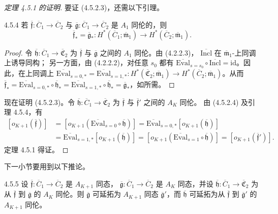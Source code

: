 \begin{proof}[定理 4.5.1 的证明]
要证 (4.5.2.3)，还需以下引理。
\begin{lemma}{4.5.4}\label{lem:4-5-4}
若 $\overline{\mathfrak f}\colon\overline C_1\to\overline C_2$
与 $\overline{\mathfrak g}\colon\overline C_1\to\overline C_2$
是 $A_1$ 同伦的，则
\[
 \overline{\mathfrak f}_*=\overline{\mathfrak g}_*\colon
 H^*(\overline C_1;\overline{\mathfrak m}_1)
 \longrightarrow
 H^*(\overline C_2;\overline{\mathfrak m}_1).
\]
\end{lemma}
\begin{proof}
令 $\overline{\mathfrak h}\colon\overline C_1\to
\overline{\mathfrak C}_2$ 为
$\overline{\mathfrak f}$ 与 $\overline{\mathfrak g}$
之间的 $A_1$ 同伦。由 (4.2.2.3)，
$\overline{\mathrm{Incl}}$ 在
$\overline{\mathfrak m}_1$-上同调上诱导同构；
另一方面，由 (4.2.2.2)，对任意 $s_0$ 都有
$\overline{\mathrm{Eval}}_{s=s_0}
\circ\overline{\mathrm{Incl}}=\mathrm{id}$。因此，在上同调上
$\overline{\mathrm{Eval}}_{s=0,*}
=\overline{\mathrm{Eval}}_{s=1,*}\colon
H^*(\overline{\mathfrak C}_2;\overline{\mathfrak m}_1)
\to H^*(\overline C_2;\overline{\mathfrak m}_1)$。从而
$\overline{\mathfrak f}_*
=\overline{\mathrm{Eval}}_{s=0,*}
\circ\overline{\mathfrak h}_*
=\overline{\mathrm{Eval}}_{s=1,*}
\circ\overline{\mathfrak h}_*
=\overline{\mathfrak g}_*$，如所需。
\end{proof}

现在证明 (4.5.2.3)。令
$\overline{\mathfrak h}\colon\overline C_1
\to\overline{\mathfrak C}_2$
为 $\overline{\mathfrak f}$ 与
$\overline{\mathfrak f}'$ 之间的 $A_K$ 同伦。
由 (4.5.2.4) 及引理 4.5.4，有
\[
 \begin{aligned}
 [o_{K+1}(\overline{\mathfrak f})]
 &=[o_{K+1}(\overline{\mathrm{Eval}}_{s=0}
       \circ\overline{\mathfrak h})]
  =\overline{\mathrm{Eval}}_{s=0,*}
       [o_{K+1}(\overline{\mathfrak h})]\\
 &=\overline{\mathrm{Eval}}_{s=1,*}
       [o_{K+1}(\overline{\mathfrak h})]
  =[o_{K+1}(\overline{\mathrm{Eval}}_{s=1}
       \circ\overline{\mathfrak h})]
  =[o_{K+1}(\overline{\mathfrak f}')].
 \end{aligned}
\]
定理 4.5.1 得证。
\end{proof}

下一小节要用到以下推论。
\begin{corollary}{4.5.5}\label{cor:4-5-5}
设 $\overline{\mathfrak f}\colon\overline C_1\to\overline C_2$
是 $A_{K+1}$ 同态，
$\overline{\mathfrak g}\colon\overline C_1\to\overline C_2$
是 $A_K$ 同态，并设
$\overline{\mathfrak h}\colon\overline C_1
\to\overline{\mathfrak C}_2$
为从 $\overline{\mathfrak f}$ 到 $\overline{\mathfrak g}$
的 $A_K$ 同伦。则 $\overline{\mathfrak g}$ 可延拓为
$A_{K+1}$ 同态 $\overline{\mathfrak g}'$，而
$\overline{\mathfrak h}$ 可延拓为从
$\overline{\mathfrak f}$ 到 $\overline{\mathfrak g}'$
的 $A_{K+1}$ 同伦。
\end{corollary}


